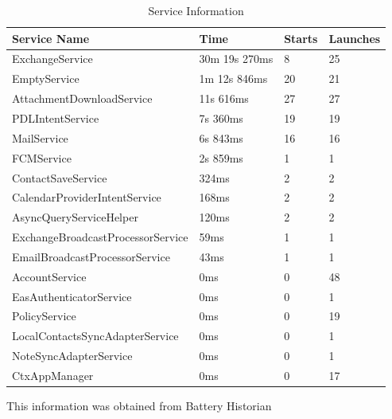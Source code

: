 \begin{table}[!h]
\begin{center}
\caption{Service Information}
\begin{tabular}{|P{7cm}|P{3cm}|P{2cm}|P{2cm}|}
\hline
Service Name                      & Time          & Starts & Launches \\ \hline
ExchangeService                   & 30m 19s 270ms & 8      & 25       \\ \hline
EmptyService                      & 1m 12s 846ms  & 20     & 21       \\ \hline
AttachmentDownloadService         & 11s 616ms     & 27     & 27       \\ \hline
PDLIntentService                  & 7s 360ms      & 19     & 19       \\ \hline
MailService                       & 6s 843ms      & 16     & 16       \\ \hline
FCMService                        & 2s 859ms      & 1      & 1        \\ \hline
ContactSaveService                & 324ms         & 2      & 2        \\ \hline
CalendarProviderIntentService     & 168ms         & 2      & 2        \\ \hline
AsyncQueryServiceHelper           & 120ms         & 2      & 2        \\ \hline
ExchangeBroadcastProcessorService & 59ms          & 1      & 1        \\ \hline
EmailBroadcastProcessorService    & 43ms          & 1      & 1        \\ \hline
AccountService                    & 0ms           & 0      & 48       \\ \hline
EasAuthenticatorService           & 0ms           & 0      & 1        \\ \hline
PolicyService                     & 0ms           & 0      & 19       \\ \hline
LocalContactsSyncAdapterService   & 0ms           & 0      &  1        \\ \hline
NoteSyncAdapterService            & 0ms           & 0      & 1        \\ \hline
CtxAppManager                     & 0ms           & 0      & 17       \\ \hline
\end{tabular}
\end{center}
\end{table}

This information was obtained from Battery Historian\\

